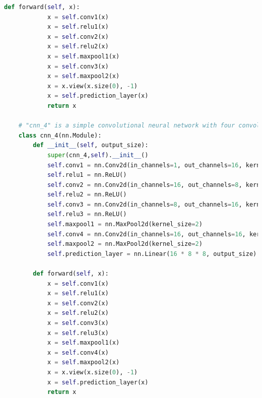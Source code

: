 \documentclass[3p,times,procedia]{elsarticle}
\begin{document}
\begin{lstlisting}[language=Python]
        def forward(self, x):
            x = self.conv1(x)
            x = self.relu1(x)
            x = self.conv2(x)
            x = self.relu2(x)
            x = self.maxpool1(x)
            x = self.conv3(x)
            x = self.maxpool2(x)
            x = x.view(x.size(0), -1)
            x = self.prediction_layer(x)
            return x
        
    # "cnn_4" is a simple convolutional neural network with four convolutional layers
    class cnn_4(nn.Module):
        def __init__(self, output_size):
            super(cnn_4,self).__init__()
            self.conv1 = nn.Conv2d(in_channels=1, out_channels=16, kernel_size=3, padding=1)  # 1x32x32 -> 16x32x32
            self.relu1 = nn.ReLU()
            self.conv2 = nn.Conv2d(in_channels=16, out_channels=8, kernel_size=3, padding=1)  # 16x32x32 -> 8x32x32
            self.relu2 = nn.ReLU()
            self.conv3 = nn.Conv2d(in_channels=8, out_channels=16, kernel_size=5, padding=2)  # 8x32x32 -> 16x32x32
            self.relu3 = nn.ReLU()
            self.maxpool1 = nn.MaxPool2d(kernel_size=2)                                       # 16x32x32 -> 16x16x16
            self.conv4 = nn.Conv2d(in_channels=16, out_channels=16, kernel_size=5, padding=2) # 16x16x16 -> 16x16x16
            self.maxpool2 = nn.MaxPool2d(kernel_size=2)                                       # 16x16x16 -> 16x8x8
            self.prediction_layer = nn.Linear(16 * 8 * 8, output_size)                        # 16x8x8 -> 10
    
        def forward(self, x):
            x = self.conv1(x)
            x = self.relu1(x)
            x = self.conv2(x)
            x = self.relu2(x)
            x = self.conv3(x)
            x = self.relu3(x)
            x = self.maxpool1(x)
            x = self.conv4(x)
            x = self.maxpool2(x)
            x = x.view(x.size(0), -1)
            x = self.prediction_layer(x)
            return x
        

\end{lstlisting}
\end{document}
